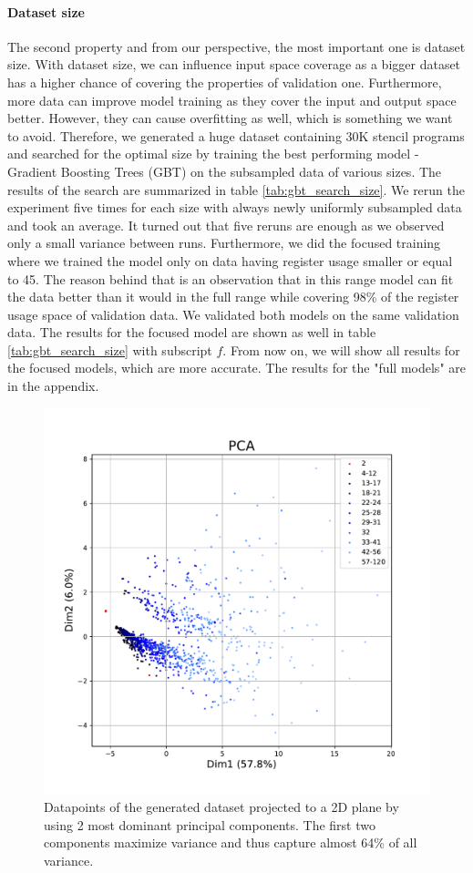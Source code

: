 \documentclass[sigplan,\review anonymous]{acmart}
\begin{document}
\paragraph{Dataset size} The second property and from our perspective, the
most important one is dataset size. With dataset size, we can influence input
space coverage as a bigger dataset has a higher chance of covering the
properties of validation one. Furthermore, more data can improve model training
as they cover the input and output space better. However, they can cause
overfitting as well, which is something we want to avoid. Therefore, we
generated a huge dataset containing 30K stencil programs and searched for the
optimal size by training the best performing model - Gradient Boosting Trees
(GBT) on the subsampled data of various sizes. The results of the search are
summarized in table  \ref{tab:gbt_search_size}. We rerun the experiment five
times for each size with always newly uniformly subsampled data and took an
average. It turned out that five reruns are enough as we observed only a small
variance between runs. Furthermore, we did the focused training where we
trained the model only on data having register usage smaller or equal to 45.
The reason behind that is an observation that in this range model can fit the
data better than it would in the full range while covering 98\% of the register
usage space of validation data. We validated both models on the same validation
data. The results for the focused model are shown as well in table
\ref{tab:gbt_search_size} with subscript $f$. From now on, we will show all
results for the focused models, which are more accurate. The results for the
"full models" are in the appendix.

\begin{figure}
  \centering
  \includegraphics[width=0.9\columnwidth]{images/pca.pdf}
  \caption{Datapoints of the generated dataset projected to a 2D plane by
  using 2 most dominant principal components. The first two components
  maximize variance and thus capture almost 64\% of all variance.}
  \label{fig:pca}
\end{figure}
\end{document}
